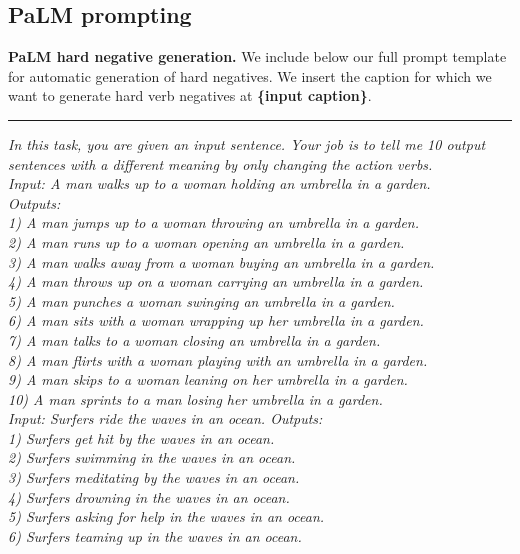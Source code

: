\subsection{PaLM prompting}\label{subsec:app:palm}

\noindent\textbf{PaLM hard negative generation.} We include below our full prompt template for automatic generation of hard negatives. We insert the caption for which we want to generate hard verb negatives at \textbf{\{input caption\}}. \\
\noindent\rule{8.5cm}{0.4pt}
\textit{In this task, you are given an input sentence. Your job is to tell me 10 output sentences with a different meaning by only changing the action verbs. \\
Input: A man walks up to a woman holding an umbrella in a garden. \\
Outputs: \\
1) A man jumps up to a woman throwing an umbrella in a garden. \\
2) A man runs up to a woman opening an umbrella in a garden. \\
3) A man walks away from a woman buying an umbrella in a garden. \\
4) A man throws up on a woman carrying an umbrella in a garden. \\
5) A man punches a woman swinging an umbrella in a garden. \\
6) A man sits with a woman wrapping up her umbrella in a garden. \\
7) A man talks to a woman closing an umbrella in a garden. \\
8) A man flirts with a woman playing with an umbrella in a garden. \\
9) A man skips to a woman leaning on her umbrella in a garden. \\
10) A man sprints to a man losing her umbrella in a garden. \\
Input: Surfers ride the waves in an ocean. 
Outputs: \\ 
1) Surfers get hit by the waves in an ocean. \\
2) Surfers swimming in the waves in an ocean. \\
3) Surfers meditating by the waves in an ocean. \\
4) Surfers drowning in the waves in an ocean. \\
5) Surfers asking for help in the waves in an ocean. \\
6) Surfers teaming up in the waves in an ocean. \\
}
